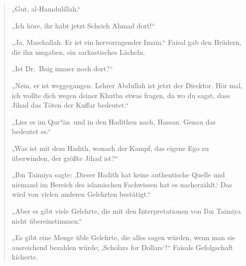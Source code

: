 \documentclass[12pt]{memoir}
\def\´{ʾ} %
\def \Quran{Qur\-\´ān} %
\begin{document}
\begin{quote}
„Gut, al-Hamdulillah.“

„Ich höre, ihr habt jetzt Scheich Ahmad dort!“

„Ja, Maschallah.
Er ist ein hervorragender Imam.“
Faisal gab den Brüdern, die ihn umgaben, ein sarkastisches Lächeln.

„Ist Dr.\ Baig immer noch dort?“

„Nein, er ist weggegangen.
Lehrer Abdullah ist jetzt der Direktor.
Hör mal, ich wollte dich wegen deiner Khutba etwas fragen,
da wo du sagst, dass Jihad das Töten der Kuffar bedeutet.“

„Lies es im \Quran\ und in den Hadithen nach, Hassan.
Genau das bedeutet es.“

„Was ist mit dem Hadith, wonach der Kampf, das eigene Ego zu überwinden,
der größte Jihad ist?“

„Ibn Taimiya sagte:
‚Dieser Hadith hat keine authentische Quelle und niemand
im Bereich des islamischen Fachwissen hat es nacherzählt.‘
Das wird von vielen anderen Gelehrten bestätigt.“

„Aber es gibt viele Gelehrte,
die mit den Interpretationen von Ibn Taimiya nicht übereinstimmen.“

„Es gibt eine Menge üble Gelehrte,
die alles sagen würden, wenn man sie ausreichend bezahlen würde;
‚Scholars for Dollars‘!“
Faisals Gefolgschaft kicherte.
\end{quote}
\end{document}
